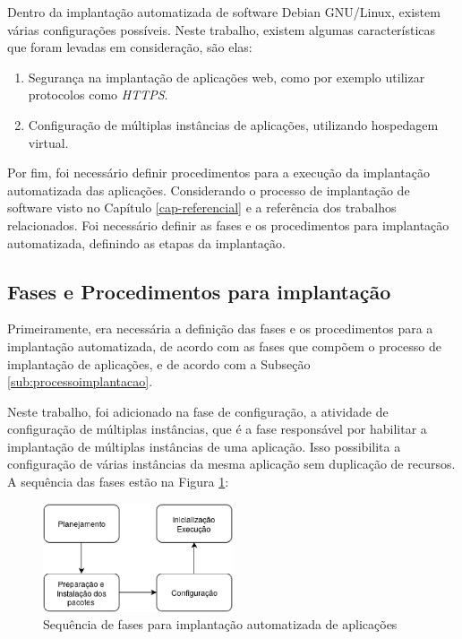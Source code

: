 Dentro da implantação automatizada de software Debian GNU/Linux, existem várias
configurações possíveis. Neste trabalho, existem algumas características que foram 
levadas em consideração, são elas:

\begin{enumerate}
  \item  Segurança na implantação de aplicações web,
   como por exemplo utilizar protocolos como \textit{HTTPS}.
  \item  Configuração de múltiplas instâncias de
   aplicações, utilizando hospedagem virtual.
\end{enumerate}

Por fim, foi necessário definir procedimentos para a execução da implantação 
automatizada das aplicações. Considerando
o processo de implantação de software visto no Capítulo \ref{cap-referencial}
e a referência dos trabalhos relacionados. Foi necessário definir as fases e os
procedimentos para implantação automatizada, definindo as etapas
da implantação.

\subsection{Fases e Procedimentos para implantação}
\label{sec:fases}

Primeiramente, era necessária a definição das fases e os procedimentos para a implantação 
automatizada, de acordo com as fases que compõem o processo de 
implantação de aplicações, e de acordo com a Subseção \ref{sub:processoimplantacao}. 

Neste trabalho, foi adicionado na fase de configuração, a atividade de configuração de múltiplas
instâncias, que é a fase responsável por habilitar a implantação de múltiplas 
instâncias de uma aplicação. Isso possibilita a configuração de várias instâncias da mesma aplicação sem duplicação de recursos. A sequência
das fases estão na Figura \ref{fig:1}:

\begin{figure}[h]
  \centering
  \includegraphics[width=0.5\textwidth]
      {figuras/fases}
      \caption{Sequência de fases para implantação automatizada de aplicações}
  \label{fig:1}
\end{figure}

